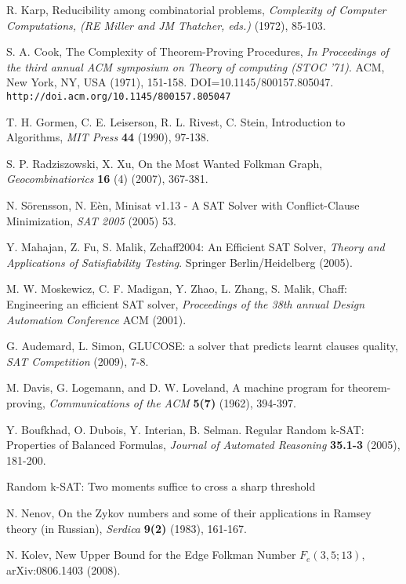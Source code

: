 \documentclass[paper=a4, fontsize=11pt]{scrartcl} %
\begin{document}
\begin{thebibliography}{9}

 R. Karp, Reducibility among combinatorial problems, \emph{Complexity of Computer Computations, (RE Miller and JM Thatcher, eds.)} (1972), 85-103.

 S. A. Cook, The Complexity of Theorem-Proving Procedures, \emph{In Proceedings of the third annual ACM symposium on Theory of computing (STOC '71)}. ACM, New York, NY, USA (1971), 151-158. DOI=10.1145/800157.805047. {\tt http://doi.acm.org/10.1145/800157.805047}

 T. H. Gormen, C. E. Leiserson, R. L. Rivest, C. Stein, Introduction to Algorithms, \emph{MIT Press} \textbf{44} (1990), 97-138.

 S. P. Radziszowski, X. Xu, On the Most Wanted Folkman Graph, \emph{Geocombinatiorics} \textbf{16} (4) (2007), 367-381.

 N. S\"{o}rensson, N. E\`{e}n, Minisat v1.13 - A SAT Solver with Conflict-Clause Minimization, \emph{SAT 2005} (2005) 53.

 Y. Mahajan, Z. Fu, S. Malik, Zchaff2004: An Efficient SAT Solver, \emph{Theory and Applications of Satisfiability Testing}. Springer Berlin/Heidelberg (2005).

 M. W. Moskewicz, C. F. Madigan, Y. Zhao, L. Zhang, S. Malik, Chaff: Engineering an efficient SAT solver, \emph{Proceedings of the 38th annual Design Automation Conference} ACM (2001).

 G. Audemard, L. Simon, GLUCOSE: a solver that predicts learnt clauses quality, \emph{SAT Competition} (2009), 7-8.

 M. Davis, G. Logemann, and D. W. Loveland, A machine program for theorem-proving, \emph{Communications of the ACM} \textbf{5(7)} (1962), 394-397.

 Y. Boufkhad, O. Dubois, Y. Interian, B. Selman. Regular Random k-SAT: Properties of Balanced Formulas, \emph{Journal of Automated Reasoning} \textbf{35.1-3} (2005), 181-200.

 Random k-SAT: Two moments suffice to cross a sharp threshold

 N. Nenov, On the Zykov numbers and some of their applications in Ramsey theory (in Russian), \emph{Serdica} \textbf{9(2)} (1983), 161-167.

 N. Kolev, New Upper Bound for the Edge Folkman Number $F_e(3,5;13)$, arXiv:0806.1403 (2008).

\end{thebibliography}
\end{document}
